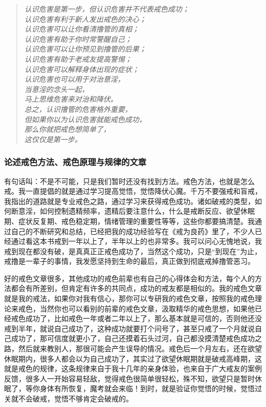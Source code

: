 \begin{quotation}\it
    认识危害是第一步，但认识危害并不代表戒色成功； \\ 认识危害有利于新人发出戒色的决心； \\ 认识危害可以让你看清撸管的真相； \\ 认识危害有助于你时常警醒自己； \\ 认识危害可以让你预见到撸管的后果； \\ 认识危害有助于老戒友提高警惕； \\ 认识危害可以解释身体出现的症状； \\ 认识危害也可以用于对治意淫， \\ 当意淫的念头一起， \\ 马上思维危害来对治和降伏。 \\ 总之，认识撸管的危害格外重要， \\ 但如果你以为认识危害就能戒色成功， \\ 那么你就把戒色想简单了， \\ 这仅仅是第一步。
\end{quotation}

\subsubsection{论述戒色方法、戒色原理与规律的文章}

有句话叫：不是不可能，只是我们暂时还没有找到方法。戒色方法，也就是怎么戒。我一直提倡的就是通过学习提高觉悟，觉悟降伏心魔。千万不要强戒和盲戒，我指出的道路就是专业戒色之路，通过学习来获得戒色成功。诸如破戒的类型，如何断意淫，如何控制遗精频率，遗精后要注意什么，什么是戒断反应、欲望休眠期、症状反复期、戒色稳定期，情绪管理的重要性等等，这些你都要搞清楚。我通过自己的不断研究和总结，已经把我的成功经验写在《戒为良药》里了，不少人已经通过看这本书戒到一年以上了，半年以上的也非常多。我可以问心无愧地说，我戒到现在都没有破，是真真正正戒色成功了，当然这个成功，只是“到现在”为止，戒撸是一辈子的事情，我发愿坚持到生命的最后，真正做到彻底戒掉撸管恶习。

好的戒色文章很多，其他成功的戒色前辈也有自己的心得体会和方法，每个人的方法都会有所差别，但肯定有许多的共同点，成功的戒友都是相似的。我的戒色文章就是我的戒法，如果你对我有信心，那你可以专研我的戒色文章，按照我的戒色理论来戒色，当然你也可以看别的前辈的戒色文章，汲取精华的戒色思想，如果他已经戒色成功了，比如戒色一年或者二年以上了，那么基本就是可信的，否则他还没戒到半年，就说自己成功了，这种成功就要打个问号了，甚至只戒了一个月就说自己成功了，那可信度就更小了，自己还摸着石头过河，自己都没摸清楚戒色成功之路，然后就来教别人，那很可能会产生误导的情况。戒色后一个月左右，还在欲望休眠期内，很多人都会以为自己成功了，其实过了欲望休眠期就是破戒高峰期，这就是戒色的规律，这条规律来自于我十几年的亲身体验，也来自于广大戒友的案例反馈，很多人一开始容易轻敌，觉得戒色很简单很轻松，殊不知，欲望只是暂时休眠了，等你身体有所恢复，魔考就会来临！到时，就是验证你觉悟的时候，觉悟过关就不会破戒，觉悟不够肯定会破戒的。

